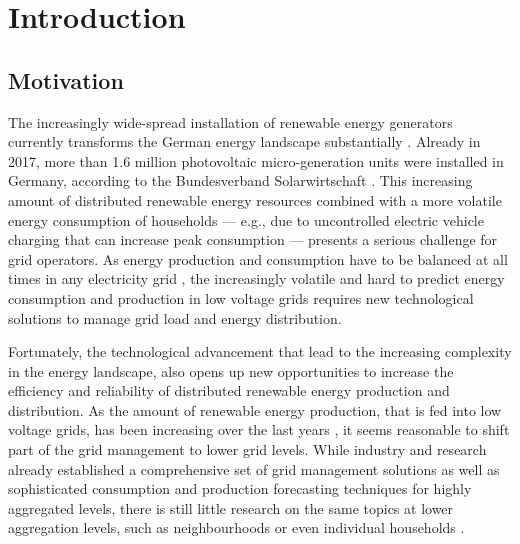 
\section{Introduction}\label{Sec:Intro}




\subsection{Motivation}\label{Sec:Intro;Subsec:Motivation}

The increasingly wide-spread installation of renewable energy generators currently transforms the German energy landscape substantially \citep{Bayer:2018}. Already in 2017, more than 1.6 million photovoltaic micro-generation units were installed in Germany, according to the Bundesverband Solarwirtschaft \citeyearpar{BSW-Solar:2018}. This increasing amount of distributed renewable energy resources combined with a more volatile energy consumption of households –-- e.g., due to uncontrolled electric vehicle charging that can increase peak consumption \citep{Fitzgerald:2016,Floch:2017} --– presents a serious challenge for grid operators. As energy production and consumption have to be balanced at all times in any electricity grid \citep{Weron:2006}, the increasingly volatile and hard to predict energy consumption and production in low voltage grids requires new technological solutions to manage grid load and energy distribution.

Fortunately, the technological advancement that lead to the increasing complexity in the energy landscape, also opens up new opportunities to increase the efficiency and reliability of distributed renewable energy production and distribution. As the amount of renewable energy production, that is fed into low voltage grids, has been increasing over the last years \citep{Bayer:2018}, it seems reasonable to shift part of the grid management to lower grid levels. While industry and research already established a comprehensive set of grid management solutions as well as sophisticated consumption and production forecasting techniques for highly aggregated levels, there is still little research on the same topics at lower aggregation levels, such as neighbourhoods or even individual households \citep{Meer:2018}.

